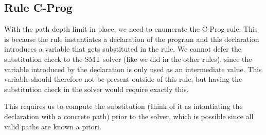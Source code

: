 \documentclass[a4paper]{article}
\begin{document}
\subsection{Rule C-Prog}
With the path depth limit in place, we need to enumerate the C-Prog rule.
This is because the rule instantiates a declaration of the program
and this declaration introduces a variable that gets substituted in the rule.
We cannot defer the substitution check to the SMT solver (like we did in the other rules),
since the variable introduced by the declaration is only used as an intermediate value.
This variable should therefore not be present outside of this rule,
but having the substitution check in the solver would require exactly this.

This requires us to compute the substitution (think of it as intantiating the declaration with a concrete path)
prior to the solver, which is possible since all valid paths are known a priori.

\end{document}
